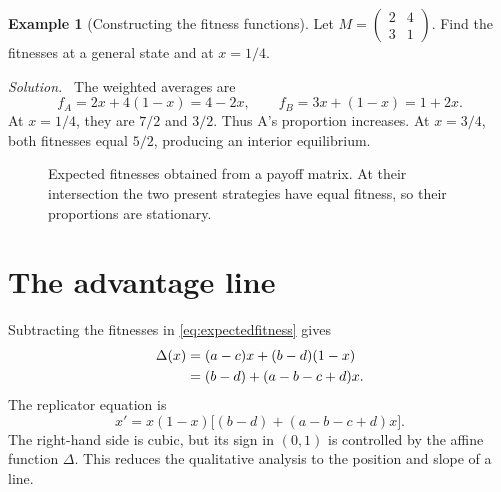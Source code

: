 \documentclass[11pt,oneside,openany]{book}
\theoremstyle{definition}
\newtheorem{example}{Example}[chapter]
\theoremstyle{remark}
\newenvironment{solution}{\par\smallskip\noindent\textit{Solution.}\ }{\par\smallskip}
\numberwithin{equation}{chapter}
\begin{document}
\begin{example}[Constructing the fitness functions]
Let $M=\left(\begin{smallmatrix}2&4\\3&1\end{smallmatrix}\right)$. Find the fitnesses at a general state and at $x=1/4$.
\begin{solution}
The weighted averages are
\[
f_A=2x+4(1-x)=4-2x,\qquad f_B=3x+(1-x)=1+2x.
\]
At $x=1/4$, they are $7/2$ and $3/2$. Thus A's proportion increases. At $x=3/4$, both fitnesses equal $5/2$, producing an interior equilibrium.
\end{solution}
\end{example}

\begin{figure}[htbp]
\centering
{}
\caption{Expected fitnesses obtained from a payoff matrix. At their intersection the two present strategies have equal fitness, so their proportions are stationary.}
\end{figure}

\section{The advantage line}
Subtracting the fitnesses in \eqref{eq:expectedfitness} gives
\begin{align}
\Delta(x)&=(a-c)x+(b-d)(1-x)\notag\\
&=(b-d)+(a-b-c+d)x.\label{eq:advantageline}
\end{align}
The replicator equation is
\begin{equation}\label{eq:matrixrep}
x'=x(1-x)\bigl[(b-d)+(a-b-c+d)x\bigr].
\end{equation}
The right-hand side is cubic, but its sign in $(0,1)$ is controlled by the affine function $\Delta$. This reduces the qualitative analysis to the position and slope of a line.
\end{document}
